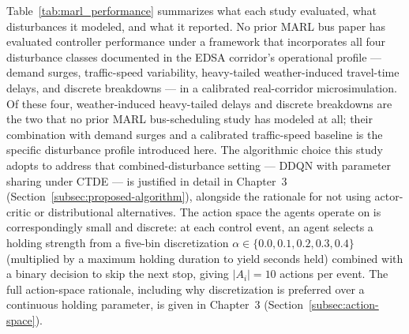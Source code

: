 Table~\ref{tab:marl_performance} summarizes what each study evaluated, what disturbances it modeled, and what it reported. No prior MARL bus paper has evaluated controller performance under a framework that incorporates all four disturbance classes documented in the EDSA corridor's operational profile --- demand surges, traffic-speed variability, heavy-tailed weather-induced travel-time delays, and discrete breakdowns --- in a calibrated real-corridor microsimulation. Of these four, weather-induced heavy-tailed delays and discrete breakdowns are the two that no prior MARL bus-scheduling study has modeled at all; their combination with demand surges and a calibrated traffic-speed baseline is the specific disturbance profile introduced here. The algorithmic choice this study adopts to address that combined-disturbance setting --- DDQN with parameter sharing under CTDE --- is justified in detail in Chapter~3 (Section~\ref{subsec:proposed-algorithm}), alongside the rationale for not using actor-critic or distributional alternatives. The action space the agents operate on is correspondingly small and discrete: at each control event, an agent selects a holding strength from a five-bin discretization $\alpha \in \{0.0, 0.1, 0.2, 0.3, 0.4\}$ (multiplied by a maximum holding duration to yield seconds held) combined with a binary decision to skip the next stop, giving $|A_i| = 10$ actions per event. The full action-space rationale, including why discretization is preferred over a continuous holding parameter, is given in Chapter~3 (Section~\ref{subsec:action-space}).

